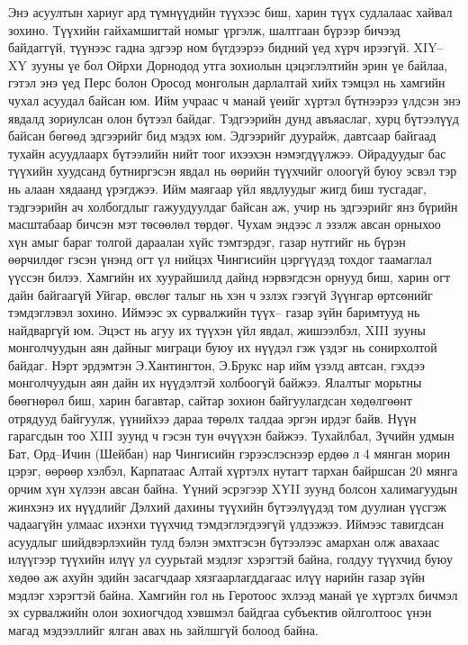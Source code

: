 Энэ асуултын хариуг ард түмнүүдийн түүхээс биш, харин түүх судлалаас хайвал зохино. Түүхийн гайхамшигтай номыг үргэлж, шалтгаан бүрээр бичээд байдаггүй, түүнээс гадна эдгээр ном бүгдээрээ бидний үед хүрч ирээгүй. XIY–XY зууны үе бол Ойрхи Дорнодод утга зохиолын цэцэглэлтийн эрин үе байлаа, гэтэл энэ үед Перс болон Оросод монголын дарлалтай хийх тэмцэл нь хамгийн чухал асуудал байсан юм. Ийм учраас ч манай үеийг хүртэл бүтнээрээ үлдсэн энэ явдалд зориулсан олон бүтээл байдаг. Тэдгээрийн дунд авъяаслаг, хурц бүтээлүүд байсан бөгөөд эдгээрийг бид мэдэх юм. Эдгээрийг дуурайж, давтсаар байгаад тухайн асуудлаарх бүтээлийн нийт тоог ихээхэн нэмэгдүүлжээ. Ойрадуудыг бас түүхийн хуудсанд бутниргэсэн явдал нь өөрийн түүхчийг олоогүй буюу эсвэл тэр нь алаан хядаанд үрэгджээ. Ийм маягаар үйл явдлуудыг жигд биш тусгадаг, тэдгээрийн ач холбогдлыг гажуудуулдаг байсан аж, учир нь эдгээрийг янз бүрийн масштабаар бичсэн мэт төсөөлөл төрдөг.
Чухам эндээс л эзэлж авсан орныхоо хүн амыг бараг толгой дараалан хүйс тэмтэрдэг, газар нутгийг нь бүрэн өөрчилдөг гэсэн үнэнд огт үл нийцэх Чингисийн цэргүүдэд тохдог таамаглал үүссэн билээ. Хамгийн их хуурайшилд дайнд нэрвэгдсэн орнууд биш, харин огт дайн байгаагүй Уйгар, өвслөг талыг нь хэн ч эзлэх гээгүй Зүүнгар өртсөнийг тэмдэглэвэл зохино. Иймээс эх сурвалжийн түүх– газар зүйн баримтууд нь найдваргүй юм.
Эцэст нь агуу их түүхэн үйл явдал, жишээлбэл, XIII зууны монголчуудын аян дайныг миграци буюу их нүүдэл гэж үздэг нь сонирхолтой байдаг. Нэрт эрдэмтэн Э.Хантингтон, Э.Брукс нар ийм үзэлд автсан, гэхдээ монголчуудын аян дайн их нүүдэлтэй холбоогүй байжээ. Ялалтыг морьтны бөөгнөрөл биш, харин багавтар, сайтар зохион байгуулагдсан хөдөлгөөнт отрядууд байгуулж, үүнийхээ дараа төрөлх талдаа эргэн ирдэг байв. Нүүн гарагсдын тоо XIII зуунд ч гэсэн тун өчүүхэн байжээ. Тухайлбал, Зүчийн удмын Бат, Орд–Ичин (Шейбан) нар Чингисийн гэрээслэснээр ердөө л 4 мянган морин цэрэг, өөрөөр хэлбэл, Карпатаас Алтай хүртэлх нутагт тархан байршсан 20 мянга орчим хүн хүлээн авсан байна. Үүний эсрэгээр XYII зуунд болсон халимагуудын жинхэнэ их нүүдлийг Дэлхий дахины түүхийн бүтээлүүдэд том дуулиан үүсгэж чадаагүйн улмаас ихэнхи түүхчид тэмдэглэгдээгүй үлдээжээ. Иймээс тавигдсан асуудлыг шийдвэрлэхийн тулд бэлэн эмхтгэсэн бүтээлээс амархан олж авахаас илүүгээр түүхийн илүү ул суурьтай мэдлэг хэрэгтэй байна, голдуу түүхчид буюу хөдөө аж ахуйн эдийн засагчдаар хязгаарлагддагаас илүү нарийн газар зүйн мэдлэг хэрэгтэй байна. Хамгийн гол нь Геротоос эхлээд манай үе хүртэлх бичмэл эх сурвалжийн олон зохиогчдод хэвшмэл байдгаа субъектив ойлголтоос үнэн магад мэдээллийг ялган авах нь зайлшгүй болоод байна.

